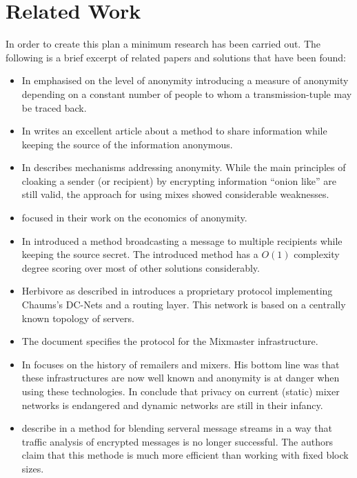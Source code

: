 \documentclass[twocolumn,a4paper,10pt,english]{scrartcl}
\begin{document}
\section{Related Work}
In order to create this plan a minimum research has been carried out. The following is a brief excerpt of related papers and solutions that have been found:
\begin{itemize}
\item In \cite{k-anonymous:ccs2003} \citeauthor{k-anonymous:ccs2003} emphasised on the level of anonymity introducing a measure of anonymity depending on a constant number of people to whom a transmission-tuple may be traced back.
\item In \citeyear{chaum-dc} \citeauthor{chaum-dc} writes an excellent article\cite{chaum-dc} about a method to share information while keeping the source of the information anonymous.
\item In \cite{chaum-mix} \citeauthor{chaum-mix} describes mechanisms addressing anonymity. While the main principles of cloaking a sender (or recipient) by encrypting information ``onion like'' are still valid, the approach for using mixes showed considerable weaknesses.
\item \citeauthor{danezis:weis2006} focused in their work \cite{danezis:weis2006} on the economics of anonymity.
\item In \cite{xor-trees} \citeauthor{xor-trees} introduced a method broadcasting a message to multiple recipients while keeping the source secret. The introduced method has a $O(1)$ complexity degree scoring over most of other solutions considerably.
\item Herbivore as described in \cite{herbivore:tr} introduces a proprietary protocol implementing Chaums's DC-Nets and a routing layer. This network is based on a centrally known topology of servers.
\item The document \cite{mixmaster-spec} specifies the protocol for the Mixmaster infrastructure.
\item In \cite{remailer-history} \citeauthor{remailer-history} focuses on the history of remailers and mixers. His bottom line was that these infrastructures are now well known and anonymity is at danger when using these technologies. In \cite{RP03-1} \citeauthor{RP03-1} conclude that privacy on current (static) mixer networks is endangered and dynamic networks are still in their infancy.
\item \citeauthor{morphmix:wpes2002} describe in \cite{morphmix:wpes2002} a method for blending serveral message streams in a way that traffic analysis of encrypted messages is no longer successful. The authors claim that this methode is much more efficient than working with fixed block sizes.

\end{itemize}
\end{document}

